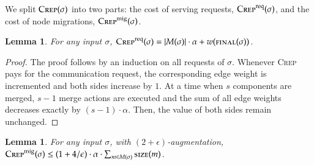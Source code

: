 \documentclass[11pt,a4paper]{scrartcl}
\newtheorem{lemma}[theorem]{Lemma}
\newcommand{\CREP}{\textsc{Crep}\xspace}
\newcommand{\CREPreq}{\CREP^\textnormal{req}}
\newcommand{\CREPmig}{\CREP^\textnormal{mig}}
\newcommand{\eps}{\ensuremath{\epsilon}}
\newcommand{\final}{\textsc{final}}
\newcommand{\size}{\textsc{size}}
\begin{document}
We split 
$\CREP(\sigma)$ into two parts: the cost of serving requests, $\CREPreq(\sigma)$, 
and the cost of node migrations, $\CREPmig(\sigma)$. 

\begin{lemma}
\label{lem:crep_req}
For any input $\sigma$, $\CREPreq(\sigma) = |M(\sigma)| \cdot \alpha + w(\final(\sigma))$.
\end{lemma}

\begin{proof}
The proof follows by an induction on all requests of $\sigma$. Whenever
\CREP pays for the communication request, the corresponding edge weight is
incremented and both sides increase by $1$. At a time when $s$ components
are merged, $s-1$ merge actions are executed and the sum of all edge weights
decreases exactly by $(s-1) \cdot \alpha$. Then, the value of both sides
remain unchanged.
\end{proof}

\begin{lemma}
\label{lem:crep_mig}
For any input $\sigma$, with $(2+\eps)$-augmentation, 
$\CREPmig(\sigma) \leq (1+4/\eps) \cdot \alpha \cdot \sum_{m \in M(\sigma)} \size(m)$.
\end{lemma}
\end{document}
